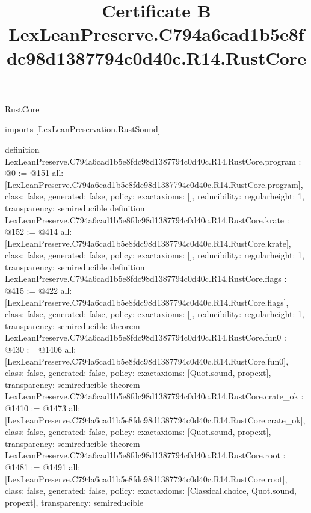 \begin{lexlean}{RustCore}
\title{Certificate B LexLeanPreserve.C794a6cad1b5e8fdc98d1387794c0d40c.R14.RustCore}
\begin{coremodule}
imports [LexLeanPreservation.RustSound]

definition LexLeanPreserve.C794a6cad1b5e8fdc98d1387794c0d40c.R14.RustCore.program : @0 := @151 {
  all: [LexLeanPreserve.C794a6cad1b5e8fdc98d1387794c0d40c.R14.RustCore.program],
  class: false,
  generated: false,
  policy: exact{axioms: []},
  reducibility: regular{height: 1},
  transparency: semireducible
}
definition LexLeanPreserve.C794a6cad1b5e8fdc98d1387794c0d40c.R14.RustCore.krate : @152 := @414 {
  all: [LexLeanPreserve.C794a6cad1b5e8fdc98d1387794c0d40c.R14.RustCore.krate],
  class: false,
  generated: false,
  policy: exact{axioms: []},
  reducibility: regular{height: 1},
  transparency: semireducible
}
definition LexLeanPreserve.C794a6cad1b5e8fdc98d1387794c0d40c.R14.RustCore.flags : @415 := @422 {
  all: [LexLeanPreserve.C794a6cad1b5e8fdc98d1387794c0d40c.R14.RustCore.flags],
  class: false,
  generated: false,
  policy: exact{axioms: []},
  reducibility: regular{height: 1},
  transparency: semireducible
}
theorem LexLeanPreserve.C794a6cad1b5e8fdc98d1387794c0d40c.R14.RustCore.fun0 : @430 := @1406 {
  all: [LexLeanPreserve.C794a6cad1b5e8fdc98d1387794c0d40c.R14.RustCore.fun0],
  class: false,
  generated: false,
  policy: exact{axioms: [Quot.sound, propext]},
  transparency: semireducible
}
theorem LexLeanPreserve.C794a6cad1b5e8fdc98d1387794c0d40c.R14.RustCore.crate_ok : @1410 := @1473 {
  all: [LexLeanPreserve.C794a6cad1b5e8fdc98d1387794c0d40c.R14.RustCore.crate_ok],
  class: false,
  generated: false,
  policy: exact{axioms: [Quot.sound, propext]},
  transparency: semireducible
}
theorem LexLeanPreserve.C794a6cad1b5e8fdc98d1387794c0d40c.R14.RustCore.root : @1481 := @1491 {
  all: [LexLeanPreserve.C794a6cad1b5e8fdc98d1387794c0d40c.R14.RustCore.root],
  class: false,
  generated: false,
  policy: exact{axioms: [Classical.choice, Quot.sound, propext]},
  transparency: semireducible
}


\end{coremodule}
\end{lexlean}

